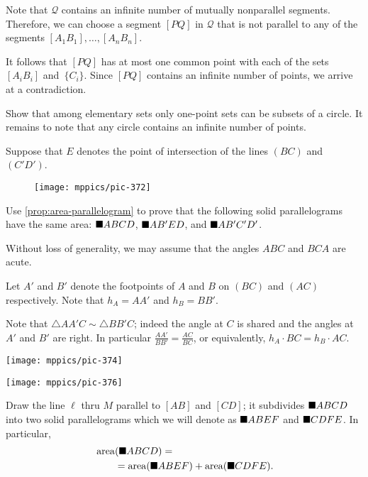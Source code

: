 Note that $\mathcal{Q}$ contains an infinite number of mutually nonparallel segments.
Therefore, we can choose a segment $[PQ]$ in $\mathcal{Q}$ 
that is not parallel to any of the segments $[A_1B_1],\dots,[A_nB_n]$.

It follows that $[PQ]$ has at most one common point with each of the sets $[A_iB_i]$ and~$\{C_i\}$.
Since $[PQ]$ contains an infinite number of points, we arrive at a contradiction.

Show that among elementary sets
only one-point sets can be subsets of a circle.
It remains to note that any circle contains an infinite number of points.

Suppose that $E$ denotes the point of intersection of the lines $(BC)$ and~$(C'D')$.

\begin{wrapfigure}[7]{r}{28mm}
\vskip-2mm
\centering
\texttt{[image: mppics/pic-372]}
\end{wrapfigure}

Use \ref{prop:area-parallelogram} to prove that the following solid parallelograms have the same area:
$\blacksquare ABCD$, $\blacksquare AB'ED$, and $\blacksquare AB'C'D'$.

Without loss of generality, we may assume that the angles $ABC$ and $BCA$ are acute.

Let $A'$ and $B'$ denote the footpoints of $A$ and $B$ on $(BC)$ and $(AC)$ respectively.
Note that $h_A=AA'$ and $h_B=BB'$.

Note that $\triangle AA'C\sim \triangle BB'C$;
indeed the angle at $C$ is shared and the angles at $A'$ and $B'$ are right.
In particular
$\frac{AA'}{BB'}=\frac{AC}{BC}$,
or equivalently, $h_A\cdot BC=h_B\cdot AC$.

\begin{Figure}
\vskip-0mm
\begin{minipage}{.49\textwidth}
\centering
\texttt{[image: mppics/pic-374]}
\end{minipage}
\hfill
\begin{minipage}{.49\textwidth}
\centering
\texttt{[image: mppics/pic-376]}
\end{minipage}
\end{Figure}

Draw the line $\ell$ 
thru $M$ parallel to $[AB]$ and $[CD]$;
it subdivides $\blacksquare ABCD$ into two solid parallelograms
which we will denote as
$\blacksquare ABEF$ and
$\blacksquare CDFE$.
In particular,
\begin{align*}
&\mathop{\rm area}\nolimits(\blacksquare ABCD)=
\\
&\qquad=
\mathop{\rm area}\nolimits(\blacksquare ABEF)+\mathop{\rm area}\nolimits(\blacksquare CDFE).
\end{align*}

